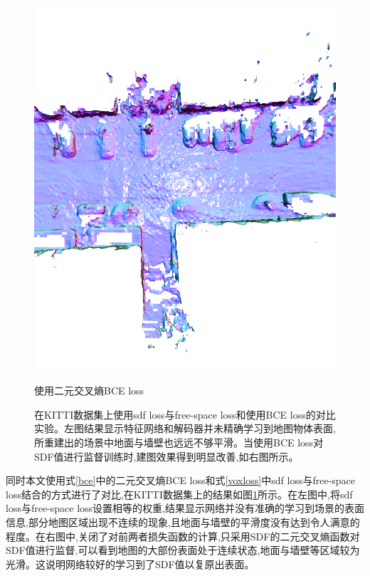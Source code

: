 \begin{figure}[htbp]
\begin{minipage}{0.45\linewidth}
		\includegraphics[width=1\linewidth]{figures/kittiobce.png}
        \caption*{使用二元交叉熵BCE loss}
	\end{minipage}
    \caption{在KITTI数据集上使用sdf loss与free-space loss和使用BCE loss的对比实验。左图结果显示特征网络和解码器并未精确学习到地图物体表面,所重建出的场景中地面与墙壁也远远不够平滑。当使用BCE loss对SDF值进行监督训练时,建图效果得到明显改善,如右图所示。}\label{becornot}
\end{figure}

同时本文使用式\ref{bce}中的二元交叉熵BCE loss和式\ref{voxloss}中sdf loss与free-space loss结合的方式进行了对比,在KITTI数据集上的结果如图\ref{becornot}所示。在左图中,将sdf loss与free-space loss设置相等的权重,结果显示网络并没有准确的学习到场景的表面信息,部分地图区域出现不连续的现象,且地面与墙壁的平滑度没有达到令人满意的程度。在右图中,关闭了对前两者损失函数的计算,只采用SDF的二元交叉熵函数对SDF值进行监督,可以看到地图的大部份表面处于连续状态,地面与墙壁等区域较为光滑。这说明网络较好的学习到了SDF值以复原出表面。

